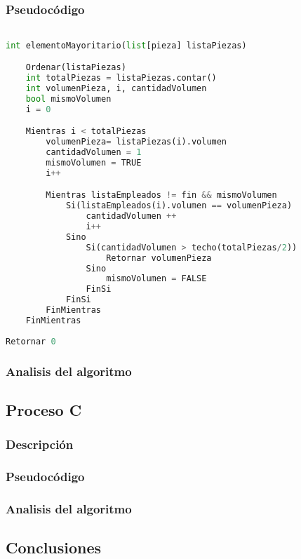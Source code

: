 \documentclass{article}
\begin{document}
\subsubsection{Pseudocódigo}

\begin{lstlisting}[language=Python, caption=Algoritmo del proceso A]

int elementoMayoritario(list[pieza] listaPiezas)

    Ordenar(listaPiezas)
    int totalPiezas = listaPiezas.contar()
    int volumenPieza, i, cantidadVolumen
    bool mismoVolumen
    i = 0

    Mientras i < totalPiezas
        volumenPieza= listaPiezas(i).volumen
        cantidadVolumen = 1
        mismoVolumen = TRUE
        i++

        Mientras listaEmpleados != fin && mismoVolumen
            Si(listaEmpleados(i).volumen == volumenPieza)
                cantidadVolumen ++
                i++
            Sino
                Si(cantidadVolumen > techo(totalPiezas/2))
                    Retornar volumenPieza
                Sino
                    mismoVolumen = FALSE
                FinSi
            FinSi
        FinMientras
    FinMientras
	
Retornar 0

\end{lstlisting}

\subsubsection{Analisis del algoritmo}

\newpage
\subsection{Proceso C}
\subsubsection{Descripción}
\subsubsection{Pseudocódigo}
\subsubsection{Analisis del algoritmo}
\subsection{Conclusiones}
\end{document}
